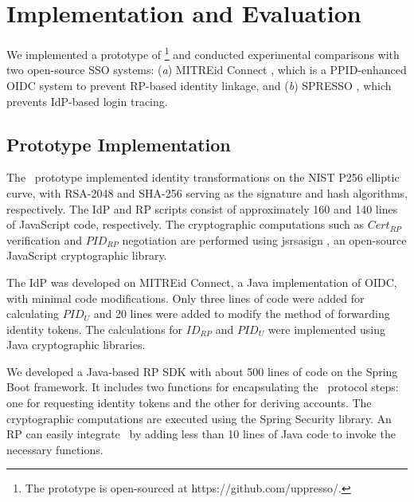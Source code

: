 \section{Implementation and Evaluation}
\label{sec:implementation}

We implemented a prototype of \usso\footnote{The prototype is open-sourced at https://github.com/uppresso/.} and conducted experimental comparisons with two open-source SSO systems: (\emph{a}) MITREid Connect \cite{MITREid}, which is a PPID-enhanced OIDC system to prevent RP-based identity linkage, and (\emph{b}) SPRESSO \cite{SPRESSO}, which prevents IdP-based login tracing.


\subsection{Prototype Implementation}
\label{subsec:proto-imple}

The \usso\ prototype implemented identity transformations on the NIST P256 elliptic curve, with RSA-2048 and SHA-256 serving as the signature and hash algorithms, respectively. The IdP and RP scripts consist of approximately 160 and 140 lines of JavaScript code, respectively.  %
The cryptographic computations such as $Cert_{RP}$ verification and $PID_{RP}$ negotiation are performed using jsrsasign \cite{jsrsasign}, an open-source JavaScript cryptographic library.

The IdP was developed on MITREid Connect\cite{MITREid}, a Java implementation of OIDC, %
with minimal code modifications. Only three lines of code were added for calculating $PID_U$ and 20 lines were added to modify the method of forwarding identity tokens.
The calculations for $ID_{RP}$ and $PID_U$ were implemented using Java cryptographic libraries.

We developed a Java-based RP SDK with about 500 lines of code on the Spring Boot framework. It includes two functions for encapsulating the \usso\ protocol steps: one for requesting identity tokens and the other for deriving accounts. The cryptographic computations are executed using the Spring Security library.
An RP can easily integrate \usso\ by  adding less than 10 lines of Java code to invoke the necessary functions.
